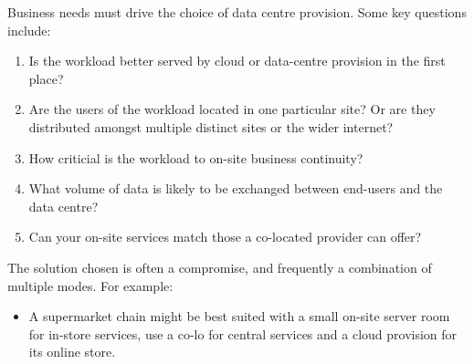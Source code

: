 Business needs must drive the choice of data centre provision.
Some key questions include:
\begin{enumerate}
\item Is the workload better served by cloud or data-centre provision in the first place?
\item Are the users of the workload located in one particular site? Or are they distributed amongst multiple distinct sites or the wider internet? 
\item How criticial is the workload to on-site business continuity?
\item What volume of data is likely to be exchanged between end-users and the data centre?
\item Can your on-site services match those a co-located provider can offer? 
\end{enumerate}
The solution chosen is often a compromise, and frequently a combination of multiple modes. For example:
\begin{itemize}
\item  A supermarket chain might be best suited with a small on-site server room for in-store services, use a co-lo for central services and a cloud provision for its online store.
\end{itemize}




